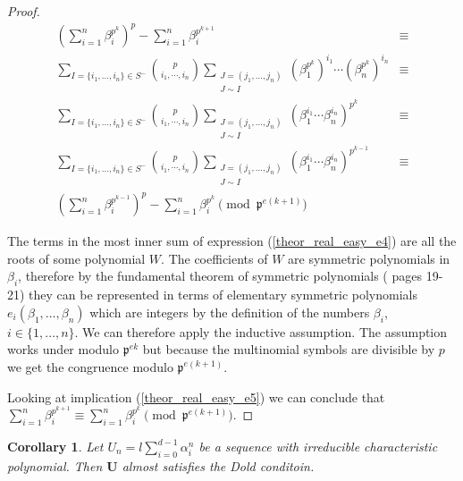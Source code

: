 \documentclass[preprint,12pt]{elsarticle}
\newcommand{\pp}{\mathfrak{p} }
\newtheorem{corollary}{Corollary}[theorem]
\begin{document}
\begin{proof}
    \begin{align}
        \left(\sum_{i=1}^n \beta_i^{p^{k}}\right)^p 
        -\sum_{i=1}^n \beta_i^{p^{k+1}}  &\equiv \\
          \sum_{I = \{i_1,\ldots,i_n\}\in S^-} \binom{p}{i_1, \cdots, i_n} 
         \sum_{\substack{J=(j_1,\ldots, j_n) \\ J \sim I}}\left(\beta_1^{p^k}\right)^{i_1} \cdots \left(\beta_n^{p^k}\right)^{i_n} &\equiv\\
           \sum_{I = \{i_1,\ldots,i_n\}\in S^-} \binom{p}{i_1, \cdots, i_n} 
         \sum_{\substack{J=(j_1,\ldots, j_n) \\ J \sim I}}\left(\beta_1^{i_1} \cdots \beta_n^{i_n}\right)^{p^k} \label{theor_real_easy_e4}&\equiv\\
          \sum_{I = \{i_1,\ldots,i_n\}\in S^-} \binom{p}{i_1, \cdots, i_n} 
         \sum_{\substack{J=(j_1,\ldots, j_n) \\ J \sim I}}\left(\beta_1^{i_1} \cdots \beta_n^{i_n}\right)^{p^{k-1}}&\equiv\\
          \left(\sum_{i=1}^n \beta_i^{p^{k-1}}\right)^p 
        -\sum_{i=1}^n \beta_i^{p^{k}} 
        \pmod{\pp^{e(k+1)}}
    \end{align}

    The terms in the most inner sum of expression (\ref{theor_real_easy_e4}) are all the roots of some polynomial $W$. The coefficients of $W$ are symmetric polynomials in $\beta_i$, therefore by the fundamental theorem of symmetric polynomials (\cite{mcdonald} pages 19-21) they can be represented in terms of elementary symmetric polynomials $e_i(\beta_1, \ldots, \beta_n)$ which are integers by the definition of the numbers $\beta_i$, $i\in\{1,\ldots ,n\}$. We can therefore apply the inductive assumption. The assumption works under modulo $\pp^{ek} $  but because the multinomial symbols are divisible by $p$ we get the congruence modulo $\pp^{e(k+1)}$.
    
    Looking at implication (\ref{theor_real_easy_e5}) we can conclude that \linebreak $\sum_{i=1}^n \beta_i^{p^{k+1}} \equiv \sum_{i=1}^n \beta_i^{p^{k}} \pmod{\pp^{e(k+1)}}$.
    

    
\end{proof}
\begin{corollary}\label{c_sum}
    Let $U_n = l\sum_{i=0}^{d-1}\alpha_i^n$ be a sequence with irreducible characteristic polynomial. Then $\mathbf{U}$ almost satisfies the Dold conditoin.
\end{corollary}
\end{document}
